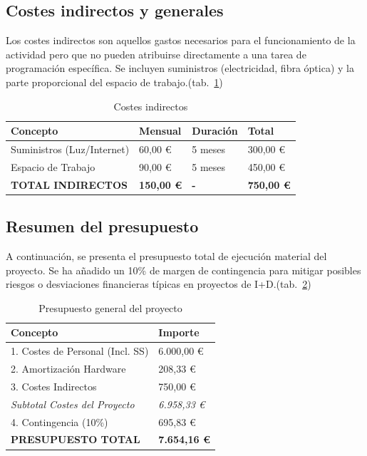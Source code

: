 \subsection{Costes indirectos y generales}
Los costes indirectos son aquellos gastos necesarios para el funcionamiento de la actividad pero que no pueden atribuirse directamente a una tarea de programación específica. Se incluyen suministros (electricidad, fibra óptica) y la parte proporcional del espacio de trabajo.(tab.~\ref{tab:costes_indirectos})

\begin{table}[h]
\centering
\caption{Costes indirectos}
\label{tab:costes_indirectos}
\begin{tabular}{p{} p{} p{} p{}}
    \toprule
    \textbf{Concepto} & \textbf{Mensual} & \textbf{Duración} & \textbf{Total} \\
    \midrule
    Suministros (Luz/Internet) & 60,00 € & 5 meses & 300,00 € \\
    \midrule
    Espacio de Trabajo & 90,00 € & 5 meses & 450,00 € \\
    \midrule
    \textbf{TOTAL INDIRECTOS} & \textbf{150,00 €} & \textbf{-} & \textbf{750,00 €} \\
    \bottomrule
\end{tabular}
\end{table}
\subsection{Resumen del presupuesto}
A continuación, se presenta el presupuesto total de ejecución material del proyecto. Se ha añadido un 10\% de margen de contingencia para mitigar posibles riesgos o desviaciones financieras típicas en proyectos de I+D.(tab.~\ref{tab:presupuesto_general})

\begin{table}[h]
\centering
\caption{Presupuesto general del proyecto}
\label{tab:presupuesto_general}
\begin{tabular}{p{} p{}}
    \toprule
    \textbf{Concepto} & \textbf{Importe} \\
    \midrule
    1. Costes de Personal (Incl. SS) & 6.000,00 € \\
    \midrule
    2. Amortización Hardware & 208,33 € \\
    \midrule
    3. Costes Indirectos & 750,00 € \\
    \midrule
    \textit{Subtotal Costes del Proyecto} & \textit{6.958,33 €} \\
    \midrule
    4. Contingencia (10\%) & 695,83 € \\
    \midrule
    \rowcolor{gray!30} \textbf{PRESUPUESTO TOTAL} & \textbf{7.654,16 €} \\
    \bottomrule
\end{tabular}
\end{table}


